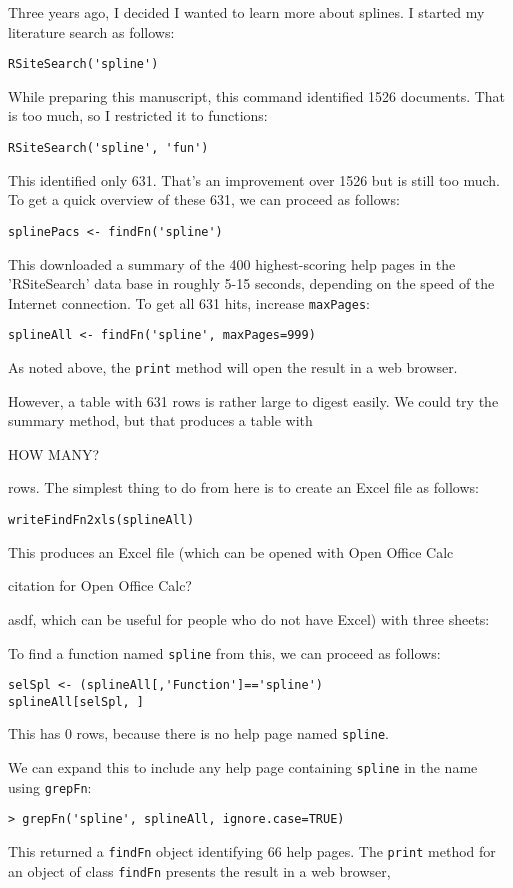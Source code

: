 Three years ago, I decided I wanted to learn more about
splines.  I started my literature search as follows:
\begin{verbatim}
RSiteSearch('spline')
\end{verbatim}
While preparing this manuscript, this command identified 1526
documents.  That is too much, so I restricted it to functions:
\begin{verbatim}
RSiteSearch('spline', 'fun')
\end{verbatim}
This identified only 631.  That's an improvement over 1526 but is 
still too much.  To get a quick overview of these 631, we can 
proceed as follows:
\begin{verbatim}
splinePacs <- findFn('spline')
\end{verbatim}
This downloaded a summary of the 400 highest-scoring help pages in
the 'RSiteSearch' data base in roughly 5-15 seconds, depending on the
speed of the Internet connection.  To get all 631 hits, increase
{\tt maxPages}:
\begin{verbatim}
splineAll <- findFn('spline', maxPages=999)
\end{verbatim}
As noted above, the {\tt print} method will open the result in 
a web browser.  

However, a table with 631 rows is rather large to digest easily.  
We could try the {\\ summary} method, but that produces a table 
with 

HOW MANY?  

rows.  The simplest thing to do from here is to create an Excel 
file as follows:  
\begin{verbatim} 
writeFindFn2xls(splineAll) 
\end{verbatim} 
This produces an Excel file (which can be opened with Open Office 
Calc 

citation for Open Office Calc?

asdf, which can be useful for people who do not have Excel) with 
three sheets:  

To find a function named {\tt spline} from this, we can proceed as
follows:
\begin{verbatim}
selSpl <- (splineAll[,'Function']=='spline')
splineAll[selSpl, ]
\end{verbatim}
This has 0 rows, because there is no help page named {\tt spline}.

We can expand this to include any help page containing {\tt spline} in
the name using {\tt grepFn}:
\begin{verbatim}
> grepFn('spline', splineAll, ignore.case=TRUE) 
\end{verbatim}
This returned a {\tt findFn} object identifying 66 help pages.  
The {\tt print} method for an object of class {\tt findFn} 
presents the result in a web browser, 

